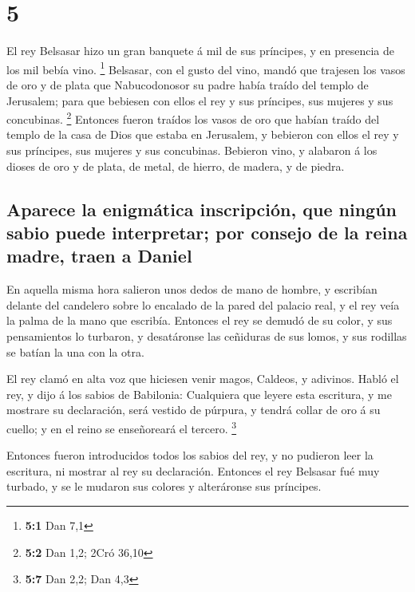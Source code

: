 \hypertarget{section-4}{%
\section{5}\label{section-4}}

 El rey Belsasar hizo un gran banquete á mil de sus
príncipes, y en presencia de los mil bebía vino. \footnote{\textbf{5:1}
  Dan 7,1}  Belsasar, con el gusto del vino, mandó que
trajesen los vasos de oro y de plata que Nabucodonosor su padre había
traído del templo de Jerusalem; para que bebiesen con ellos el rey y sus
príncipes, sus mujeres y sus concubinas. \footnote{\textbf{5:2} Dan 1,2;
  2Cró 36,10}  Entonces fueron traídos los vasos de oro que
habían traído del templo de la casa de Dios que estaba en Jerusalem, y
bebieron con ellos el rey y sus príncipes, sus mujeres y sus concubinas.
 Bebieron vino, y alabaron á los dioses de oro y de plata,
de metal, de hierro, de madera, y de piedra.

\hypertarget{aparece-la-enigmuxe1tica-inscripciuxf3n-que-ninguxfan-sabio-puede-interpretar-por-consejo-de-la-reina-madre-traen-a-daniel}{%
\subsection{Aparece la enigmática inscripción, que ningún sabio puede
interpretar; por consejo de la reina madre, traen a
Daniel}\label{aparece-la-enigmuxe1tica-inscripciuxf3n-que-ninguxfan-sabio-puede-interpretar-por-consejo-de-la-reina-madre-traen-a-daniel}}

 En aquella misma hora salieron unos dedos de mano de
hombre, y escribían delante del candelero sobre lo encalado de la pared
del palacio real, y el rey veía la palma de la mano que escribía.
 Entonces el rey se demudó de su color, y sus pensamientos
lo turbaron, y desatáronse las ceñiduras de sus lomos, y sus rodillas se
batían la una con la otra.

 El rey clamó en alta voz que hiciesen venir magos, Caldeos,
y adivinos. Habló el rey, y dijo á los sabios de Babilonia: Cualquiera
que leyere esta escritura, y me mostrare su declaración, será vestido de
púrpura, y tendrá collar de oro á su cuello; y en el reino se
enseñoreará el tercero. \footnote{\textbf{5:7} Dan 2,2; Dan 4,3}

 Entonces fueron introducidos todos los sabios del rey, y no
pudieron leer la escritura, ni mostrar al rey su declaración.
 Entonces el rey Belsasar fué muy turbado, y se le mudaron
sus colores y alteráronse sus príncipes.

